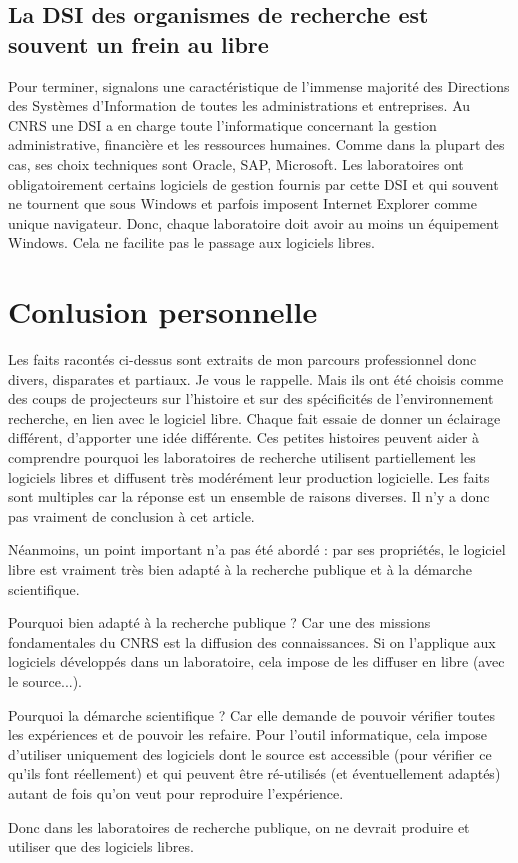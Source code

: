 \documentclass{FramateX}
\begin{document}
\begin{refsection}
\subsection*{La DSI des organismes de recherche est souvent un frein au libre}
{}


Pour terminer, signalons une caractéristique de l'immense majorité des
Directions des Systèmes d'Information de toutes les administrations et
entreprises. Au CNRS une DSI a en charge toute l'informatique
concernant la gestion administrative, financière et les ressources
humaines. Comme dans la plupart des cas, ses choix techniques sont
Oracle, SAP, Microsoft. Les laboratoires ont obligatoirement certains
logiciels de gestion fournis par cette DSI et qui souvent ne tournent
que sous Windows et parfois imposent Internet Explorer comme unique
navigateur. Donc, chaque laboratoire doit avoir au moins un équipement
Windows. Cela ne facilite pas le passage aux logiciels libres.

\section*{Conlusion personnelle}
{}

Les faits racontés ci-dessus sont extraits de mon parcours professionnel
donc divers, disparates et partiaux. Je vous le rappelle. Mais ils ont
été choisis comme des coups de projecteurs sur l'histoire et sur des
spécificités de l'environnement recherche, en lien avec le logiciel
libre. Chaque fait essaie de donner un éclairage différent, d'apporter
une idée différente. Ces petites histoires peuvent aider à comprendre
pourquoi les laboratoires de recherche utilisent partiellement les
logiciels libres et diffusent très modérément leur production
logicielle. Les faits sont multiples car la réponse est un ensemble de
raisons diverses. Il n'y a donc pas vraiment de conclusion à cet
article.

Néanmoins, un point important n'a pas été abordé : par ses propriétés,
le logiciel libre est vraiment très bien adapté à la recherche publique
et à la démarche scientifique.

Pourquoi bien adapté à la recherche publique ? Car une des missions
fondamentales du CNRS est la diffusion des connaissances. Si on
l'applique aux logiciels développés dans un laboratoire, cela impose de
les diffuser en libre (avec le source...).

Pourquoi la démarche scientifique ? Car elle demande de pouvoir vérifier
toutes les expériences et de pouvoir les refaire. Pour l'outil
informatique, cela impose d'utiliser uniquement des logiciels dont le
source est accessible (pour vérifier ce qu'ils font réellement) et qui
peuvent être ré-utilisés (et éventuellement adaptés) autant de fois
qu'on veut pour reproduire l'expérience.

Donc dans les laboratoires de recherche publique, on ne devrait produire
et utiliser que des logiciels libres.



\end{refsection} 
\end{document}
